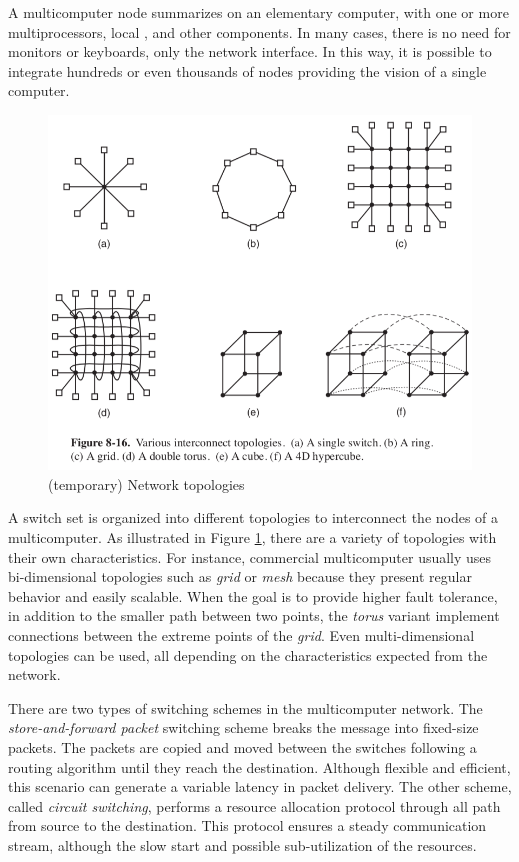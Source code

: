 				A multicomputer node summarizes on an elementary computer, with one or
				more multiprocessors, local \ram, and other components.
				In many cases, there is no need for monitors or keyboards, only the
				network interface.
				In this way, it is possible to integrate hundreds or even thousands
				of nodes providing the vision of a single computer.

				\begin{figure}[h]
					\centering
					\includegraphics[width=.8\textwidth]{images/net-topologies.png}

					\caption{
						(temporary) Network topologies
					}\par
					\label{fig::net_topologies}
				\end{figure}
				
				A switch set is organized into different topologies to interconnect
				the nodes of a multicomputer.
				As illustrated in Figure \ref{fig::net_topologies}, there are a
				variety of topologies with their own characteristics.
				For instance, commercial multicomputer usually uses bi-dimensional
				topologies such as \textit{grid} or \textit{mesh} because they present
				regular behavior and easily scalable.
				When the goal is to provide higher fault tolerance, in addition to the
				smaller path between two points, the \textit{torus} variant implement
				connections between the extreme points of the \textit{grid}.
				Even multi-dimensional topologies can be used, all depending on the
				characteristics expected from the network.

				There are two types of switching schemes in the multicomputer network.
				The \textit{store-and-forward packet} switching scheme breaks the message
				into fixed-size packets.
				The packets are copied and moved between the switches following a
				routing algorithm until they reach the destination.
				Although flexible and efficient, this scenario can generate a variable
				latency in packet delivery.
				The other scheme, called \textit{circuit switching}, performs a resource
				allocation protocol through all path from source to the destination.
				This protocol ensures a steady communication stream, although the
				slow start and possible sub-utilization of the resources.

